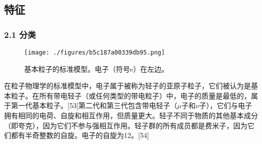 \subsection{特征}
\subsubsection{2.1 分类}
\begin{figure}[ht]
\centering
\texttt{[image: ./figures/b5c187a00339db95.png]}
\caption{基本粒子的标准模型。电子（符号e）在左边。} \label{fig_DZ_5}
\end{figure}
在粒子物理学的标准模型中，电子属于被称为轻子的亚原子粒子，它们被认为是基本粒子。在所有带电轻子（或任何类型的带电粒子）中，电子的质量是最低的，属于第一代基本粒子。[53]第二代和第三代包含带电轻子（$\mu$子和$\nu$子），它们与电子拥有相同的电荷、自旋和相互作用，但质量更大。轻子不同于物质的其他基本成分（即夸克），因为它们不参与强相互作用。轻子群的所有成员都是费米子，因为它们都有半奇整数的自旋。电子的自旋为12。[54]